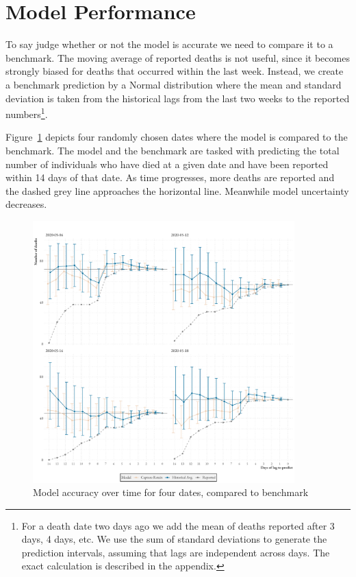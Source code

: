 \documentclass[a4paper,11pt,article,oneside,openany,american]{memoir}
\begin{document}
\section{Model Performance}
To say judge whether or not the model is accurate we need to compare it to a benchmark. The moving average of reported deaths is not useful, since it becomes strongly biased for deaths that occurred within the last week. Instead, we create a benchmark prediction by a Normal distribution where the mean and standard deviation is taken from the historical lags from the last two weeks to the reported numbers\footnote{For a death date two days ago we add the mean of deaths reported after 3 days, 4 days, etc. We use the sum of standard deviations to generate the prediction intervals, assuming that lags are independent across days. The exact calculation is described in the appendix.}. 

Figure~\ref{fig:four_dates} depicts four randomly chosen dates where the model is compared to the benchmark. The model and the benchmark are tasked with predicting the total number of individuals who have died at a given date and have been reported within 14 days of that date. As time progresses, more deaths are reported and the dashed grey line approaches the horizontal line. Meanwhile model uncertainty decreases.

\begin{figure}
    \centering
    \includegraphics[width=0.9\textwidth]{../plots/lag_prediction_by_date}
    \caption{Model accuracy over time for four dates, compared to benchmark}
    \label{fig:four_dates}
\end{figure}
\end{document}
